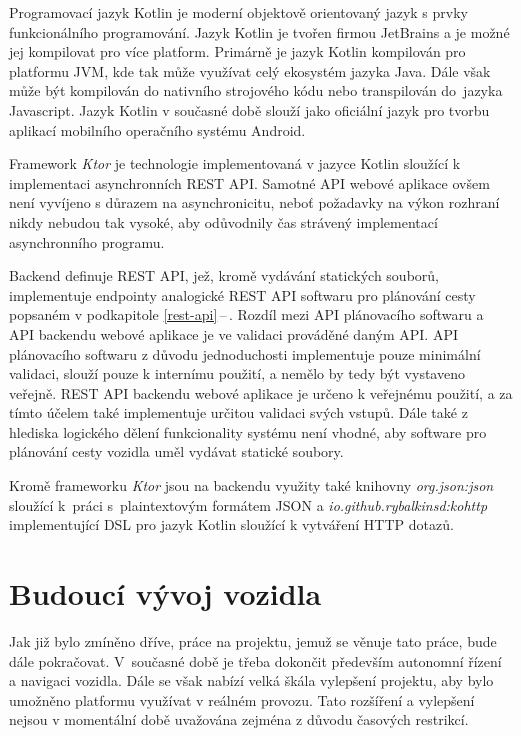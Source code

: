 \documentclass[czech, bachelor]{diploma}
\newcommand{\peteref}[1]{\ref{#1}\,--\,\nameref{#1}}
\begin{document}
Programovací jazyk Kotlin je moderní objektově orientovaný jazyk s prvky funkcionálního programování. Jazyk Kotlin je tvořen
firmou JetBrains a je možné jej kompilovat pro více platform. Primárně je jazyk Kotlin kompilován pro platformu JVM, kde tak může
využívat celý ekosystém jazyka Java. Dále však může být kompilován do nativního strojového kódu nebo transpilován do~jazyka
Javascript. Jazyk Kotlin v současné době slouží jako oficiální jazyk pro tvorbu aplikací mobilního operačního systému
Android\cite{kotlin-android-source}.

Framework \emph{Ktor} je technologie implementovaná v jazyce Kotlin sloužící k implementaci asynchronních
REST API\cite{ktor-source}. Samotné API webové aplikace ovšem není vyvíjeno s důrazem na asynchronicitu, neboť požadavky na výkon
rozhraní nikdy nebudou tak vysoké, aby odůvodnily čas strávený implementací asynchronního programu.

Backend definuje REST API\cite{rest-source}, jež, kromě vydávání statických souborů, implementuje endpointy analogické REST API
softwaru pro plánování cesty popsaném v podkapitole \peteref{rest-api}. Rozdíl mezi API plánovacího softwaru a API backendu
webové aplikace je ve validaci prováděné daným API. API plánovacího softwaru z důvodu jednoduchosti implementuje pouze minimální
validaci, slouží pouze k internímu použití, a nemělo by tedy být vystaveno veřejně. REST API backendu webové aplikace je určeno
k veřejnému použití, a za tímto účelem také implementuje určitou validaci svých vstupů. Dále také z hlediska logického dělení
funkcionality systému není vhodné, aby software pro plánování cesty vozidla uměl vydávat statické soubory.

Kromě frameworku \emph{Ktor} jsou na backendu využity také knihovny \emph{org.json:json}\cite{jsonjava-source} sloužící k~práci
s~plaintextovým formátem JSON\cite{json-source} a \emph{io.github.rybalkinsd:kohttp}\cite{kohttp-source} implementující DSL pro
jazyk Kotlin sloužící k vytváření HTTP dotazů.

\chapter{Budoucí vývoj vozidla}

Jak již bylo zmíněno dříve, práce na projektu, jemuž se věnuje tato práce, bude dále pokračovat. V~současné době je třeba dokončit
především autonomní řízení a navigaci vozidla. Dále se však nabízí velká škála vylepšení projektu, aby bylo umožněno platformu
využívat v reálném provozu. Tato rozšíření a vylepšení nejsou v momentální době uvažována zejména z důvodu časových restrikcí.
\end{document}
